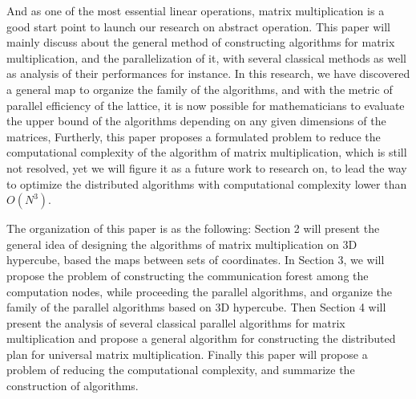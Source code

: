 \documentclass{amsart}
\theoremstyle{definition}
\theoremstyle{remark}
\numberwithin{equation}{section}
\begin{document}
	And as one of the most essential linear operations, matrix multiplication is a good start point to launch our research on abstract operation. This paper will mainly discuss about the general method of constructing algorithms for matrix multiplication, and the parallelization of it, with several classical methods as well as analysis of their performances for instance.
In this research, we have discovered a general map to organize the family of the algorithms, and with the metric of parallel efficiency of the lattice, it is now possible for mathematicians to evaluate the upper bound of the algorithms depending on any given dimensions of the matrices, 
Furtherly, this paper proposes a formulated problem to reduce the computational complexity of the algorithm of matrix multiplication, which is still not resolved, yet we will figure it as a future work to research on, to lead the way to optimize the distributed algorithms with computational complexity lower than $O(N^3)$.\par

	The organization of this paper is as the following: Section 2 will present the general idea of designing the algorithms of matrix multiplication on 3D hypercube, based the maps between sets of coordinates. In Section 3, we will propose the problem of constructing the communication forest among the computation nodes, while proceeding the parallel algorithms, and organize the family of the parallel algorithms based on 3D hypercube. Then Section 4 will present the analysis of several classical parallel algorithms for matrix multiplication and propose a general algorithm for constructing the distributed plan for universal matrix multiplication. Finally this paper will propose a problem of reducing the computational complexity, and summarize the construction of algorithms.\par
\end{document}
